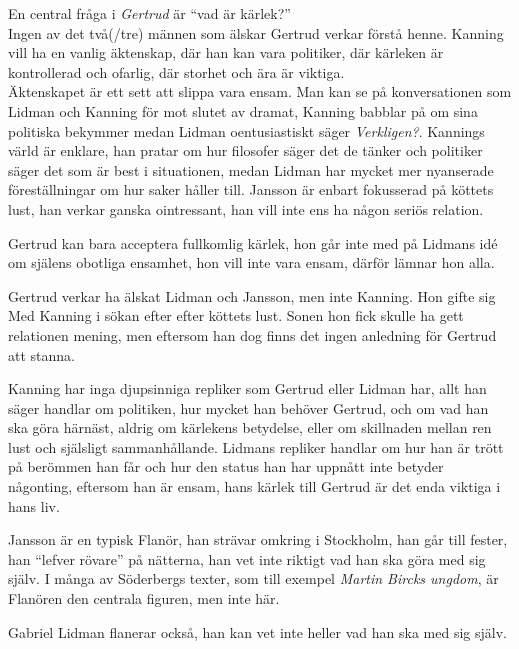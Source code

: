 \documentclass[12pt, letterpaper, twoside]{article}
\begin{document}
\begin{flushleft}

En central fråga i \textit{Gertrud} är ``vad är kärlek?''\\

Ingen av det två(/tre) männen som älskar Gertrud verkar förstå henne. Kanning vill ha en vanlig
äktenskap, där han kan vara politiker, där kärleken är kontrollerad och ofarlig,
där storhet och ära är viktiga.\\
Äktenskapet är ett sett att slippa vara ensam.
Man kan se på konversationen som Lidman och Kanning för mot slutet av dramat, Kanning babblar på om sina
politiska bekymmer medan Lidman oentusiastiskt säger \textit{Verkligen?}. Kannings värld är enklare,
han pratar om hur filosofer säger det de tänker och politiker säger det som är best i situationen,
medan Lidman har mycket mer nyanserade föreställningar om hur saker håller till.
Jansson är enbart fokusserad på köttets lust, han verkar ganska ointressant, han vill inte ens ha
någon seriös relation.

\hfill

Gertrud kan bara acceptera fullkomlig kärlek, hon går inte med på Lidmans idé om själens obotliga ensamhet,
hon vill inte vara ensam, därför lämnar hon alla.

Gertrud verkar ha älskat Lidman och Jansson, men inte Kanning. Hon gifte sig Med Kanning i sökan efter
efter köttets lust. Sonen hon fick skulle ha gett relationen mening, men eftersom han dog finns det ingen
anledning för Gertrud att stanna.

\hfill

Kanning har inga djupsinniga repliker som Gertrud eller Lidman har, allt han säger handlar om politiken,
hur mycket han behöver Gertrud, och om vad han ska göra härnäst, aldrig om kärlekens betydelse, eller
om skillnaden mellan ren lust och själsligt sammanhållande.
Lidmans repliker handlar om hur han är trött på berömmen han får och hur den status han har uppnått inte
betyder någonting, eftersom han är ensam, hans kärlek till Gertrud är det enda viktiga i hans liv.


Jansson är en typisk Flanör, han strävar omkring i Stockholm, han går till fester, han ``lefver rövare''
på nätterna, han vet inte riktigt vad han ska göra med sig själv. I många av Söderbergs texter,
som till exempel \textit{Martin Bircks ungdom}, är Flanören den centrala figuren, men inte här.

Gabriel Lidman flanerar också, han kan vet inte heller vad han ska med sig själv.


\end{flushleft}
\end{document}
